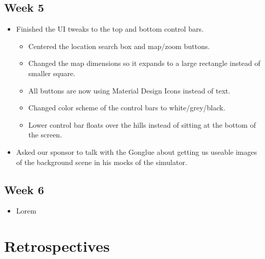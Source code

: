 \documentclass[10pt, onecolumn, draftclsnofoot, letterpaper, compsoc]{IEEEtran}
\begin{document}
\subsection{Week 5}

    \begin{itemize}

    \item Finished the UI tweaks to the top and bottom control bars.

        \begin{itemize}

            \item Centered the location search box and map/zoom buttons.

            \item Changed the map dimensions so it expands to a large rectangle instead of smaller square.

            \item All buttons are now using Material Design Icons instead of text.

            \item Changed color scheme of the control bars to white/grey/black.

            \item Lower control bar floats over the hills instead of sitting at the bottom of the screen.

        \end{itemize}

    \item Asked our sponsor to talk with the Gonglue about getting us useable images of the background
          scene in his mocks of the simulator.

    \end{itemize}

\subsection{Week 6}

    \begin{itemize}

    \item Lorem

    \end{itemize}

\section{Retrospectives}
\end{document}
